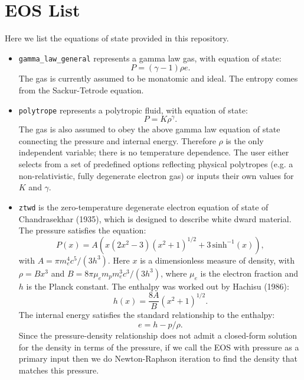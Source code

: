\documentclass[11pt]{book}
\begin{document}
\section{EOS List}

Here we list the equations of state provided in this repository.

\begin{itemize}

\item {\tt gamma\_law\_general} represents a gamma law gas, with equation of state:
\begin{equation}
  P = (\gamma - 1) \rho e.
\end{equation}
The gas is currently assumed to be monatomic and ideal. The entropy comes from the Sackur-Tetrode equation.

\item {\tt polytrope} represents a polytropic fluid, with equation of state:
\begin{equation}
  P = K \rho^\gamma.
\end{equation}
The gas is also assumed to obey the above gamma law equation of state
connecting the pressure and internal energy. Therefore $\rho$ is the
only independent variable; there is no temperature dependence. The
user either selects from a set of predefined options reflecting
physical polytropes (e.g. a non-relativistic, fully degenerate
electron gas) or inputs their own values for $K$ and $\gamma$.

\item {\tt ztwd} is the zero-temperature degenerate electron equation of state 
of Chandrasekhar (1935), which is designed to describe white dward material. The 
pressure satisfies the equation:
\begin{equation}
  P(x) = A \left( x(2x^2-3)(x^2 + 1)^{1/2} + 3\, \text{sinh}^{-1}(x) \right),
\end{equation}
with $A = \pi m_e^4 c^5 / (3 h^3)$. Here $x$ is a dimensionless measure of density,
with $\rho = B x^3$ and $B = 8\pi \mu_e m_p m_e^3 c^3 / (3h^3)$, 
where $\mu_e$ is the electron fraction and $h$ is the Planck constant. The enthalpy 
was worked out by Hachisu (1986):
\begin{equation}
  h(x) = \frac{8A}{B}\left(x^2 + 1\right)^{1/2}.
\end{equation}
The internal energy satisfies the standard relationship to the enthalpy:
\begin{equation}
  e = h - p / \rho.
\end{equation}
Since the pressure-density relationship does not admit a closed-form 
solution for the density in terms of the pressure, if we call the EOS 
with pressure as a primary input then we do Newton-Raphson iteration 
to find the density that matches this pressure.


\end{itemize}
\end{document}
